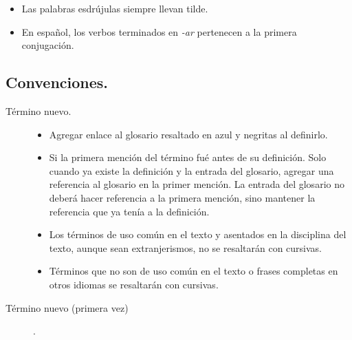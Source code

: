 \begin{itemize}
            \item Las palabras esdrújulas siempre llevan tilde.
            
            \item En español, los verbos terminados en \textit{-ar} pertenecen a la primera conjugación.
            
        \end{itemize}
    
    \subsection{Convenciones.}
    
    \begin{description}
        \item[Término nuevo.]\hfil
        \begin{itemize}
            \item Agregar enlace al glosario resaltado en azul y negritas al definirlo.
            \item Si la primera mención del término fué antes de su definición. Solo cuando ya existe la definición y la entrada del glosario, agregar una referencia al glosario en la primer mención. La entrada del glosario no deberá hacer referencia a la primera mención, sino mantener la referencia que ya tenía a la definición.
            \item Los términos de uso común en el texto y asentados en la disciplina del texto, aunque sean extranjerismos, no se resaltarán con cursivas.
            \item Términos que no son de uso común en el texto o frases completas en otros idiomas se resaltarán con cursivas.
        \end{itemize}
    \end{description}

\begin{description}
    \item[Término nuevo (primera vez)].
\end{description}

